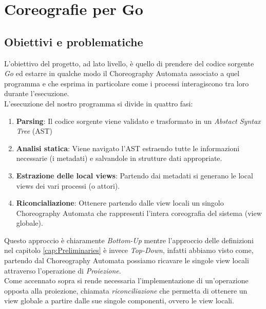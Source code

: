 \chapter{Coreografie per Go}
\section{Obiettivi e problematiche}
L'obiettivo del progetto, ad lato livello, è quello di prendere del codice sorgente \emph{Go} ed estarre in qualche modo il Choreography Automata associato a quel programma e che esprima in particolare come i processi interagiscono tra loro durante l'esecuzione.\\
L'esecuzione del nostro programma si divide in quattro fasi:
\begin{enumerate}
    \item \textbf{Parsing}: Il codice sorgente viene validato e trasformato in un \emph{Abstact Syntax Tree} (AST)
    \item \textbf{Analisi statica}: Viene navigato l'AST estraendo tutte le informazioni necessarie (i metadati) e salvandole in strutture dati appropriate.
    \item \textbf{Estrazione delle local views}: Partendo dai metadati si generano le local views dei vari processi (o attori).
    \item \textbf{Riconcialiazione}: Ottenere partendo dalle view locali un singolo Choreography Automata che rappresenti l'intera coreografia del sistema (view globale).
\end{enumerate}
Questo approccio è chiaramente \emph{Bottom-Up} mentre l'approccio delle definizioni nel capitolo \ref{cap:Preliminaries} è invece \emph{Top-Down}, infatti abbiamo visto come, partendo dal Choreography Automata possiamo ricavare le singole view locali attraverso l'operazione di \emph{Proiezione}.\\
Come accennato sopra si rende necessaria l'implementazione di un'operazione opposta alla proiezione, chiamata \emph{riconciliazione} che permetta di ottenere un view globale a partire dalle sue singole componenti, ovvero le view locali.

